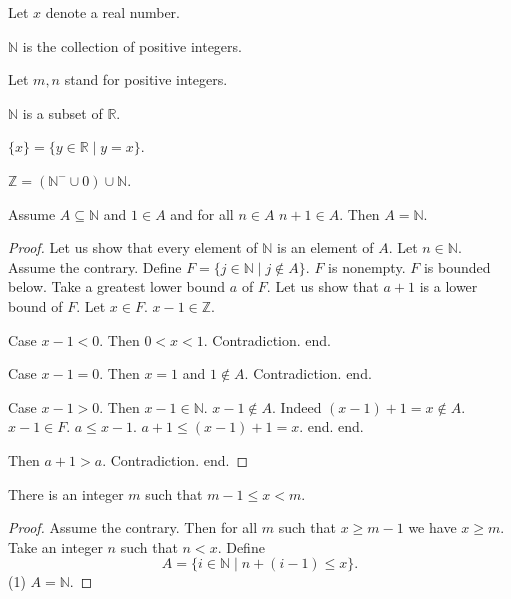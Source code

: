 \documentclass{article}
\begin{document}
\begin{forthel}
Let $x$ denote a real number.

\begin{definition}
$\mathbb{N}$ is the collection
of positive integers.
\end{definition}
Let $m,n$ stand for positive integers.

\begin{lemma}
$\mathbb{N}$ is a subset of $\mathbb{R}$.
\end{lemma}

\begin{definition}
$\{x\} = \{y \in \mathbb{R} \mid y = x\}$.
\end{definition}

\begin{lemma}
$\mathbb{Z} = (\mathbb{N}^- \cup {0}) \cup \mathbb{N}$.
\end{lemma}

\begin{theorem}
Assume $A \subseteq \mathbb{N}$
and $1 \in A$ and for all $n \in A$ $n + 1 \in A$.
Then $A = \mathbb{N}$.
\end{theorem}

\begin{proof}
Let us show that every element of $\mathbb{N}$ is an element of $A$.
	Let $n \in \mathbb{N}$.
	Assume the contrary.
	Define $F = \{  j \in \mathbb{N} \mid j \notin A\}$.
	$F$ is nonempty. $F$ is bounded below.
  Take a greatest lower bound $a$ of $F$.
	Let us show that $a+1$ is a lower bound of $F$.
		Let $x \in F$. $x - 1 \in \mathbb{Z}$.

		Case $x - 1 < 0$. Then $0 < x < 1$. Contradiction. end.

		Case $x - 1 = 0$. Then $x = 1$ and $1 \notin A$. Contradiction. end.

		Case $x - 1 > 0$. Then $x - 1 \in \mathbb{N}$.
      $x - 1 \notin A$. Indeed $(x - 1) + 1 = x \notin A$. $x - 1 \in F$.
			$a \leq x - 1$.
			$a + 1 \leq (x - 1) + 1 = x$.
		end.
	end.

	Then $a+1 > a$.
	Contradiction.
end.
\end{proof}

\begin{lemma}
There is an integer $m$ such that
$m -1 \leq x < m$.
\end{lemma}
\begin{proof}
Assume the contrary.
Then for all $m$ such that $x \geq m-1 $ we have $x \geq m$.
Take an integer $n$ such that $n < x$.
Define
\[ A = \{i \in \mathbb{N} \mid n + (i - 1) \leq x\}. \]
(1) $A = \mathbb{N}$.


\end{proof}
\end{forthel}
\end{document}
